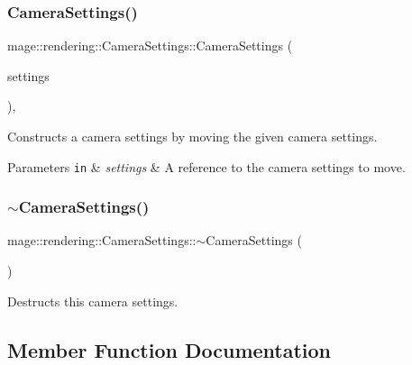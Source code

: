 \subsubsection{\texorpdfstring{Camera\+Settings()}{CameraSettings()}\hspace{0.1cm}{\footnotesize\ttfamily [3/3]}}
{\footnotesize\ttfamily mage\+::rendering\+::\+Camera\+Settings\+::\+Camera\+Settings (\begin{DoxyParamCaption}\item[{\hyperlink{classmage_1_1rendering_1_1_camera_settings}{Camera\+Settings} \&\&}]{settings }\end{DoxyParamCaption})\hspace{0.3cm}{\ttfamily [default]}, {\ttfamily [noexcept]}}

Constructs a camera settings by moving the given camera settings.


\begin{DoxyParams}[1]{Parameters}
\mbox{\tt in}  & {\em settings} & A reference to the camera settings to move. \\
\hline
\end{DoxyParams}
\hypertarget{classmage_1_1rendering_1_1_camera_settings_a0e5badc4e959b8ddad0d7df2da4c934f}{}\label{classmage_1_1rendering_1_1_camera_settings_a0e5badc4e959b8ddad0d7df2da4c934f} 
\subsubsection{\texorpdfstring{$\sim$\+Camera\+Settings()}{~CameraSettings()}}
{\footnotesize\ttfamily mage\+::rendering\+::\+Camera\+Settings\+::$\sim$\+Camera\+Settings (\begin{DoxyParamCaption}{ }\end{DoxyParamCaption})\hspace{0.3cm}{\ttfamily [default]}}

Destructs this camera settings. 

\subsection{Member Function Documentation}
\hypertarget{classmage_1_1rendering_1_1_camera_settings_a921ff9ebe3ff05890f0e3dd8b71fcb7f}{}\label{classmage_1_1rendering_1_1_camera_settings_a921ff9ebe3ff05890f0e3dd8b71fcb7f} 
